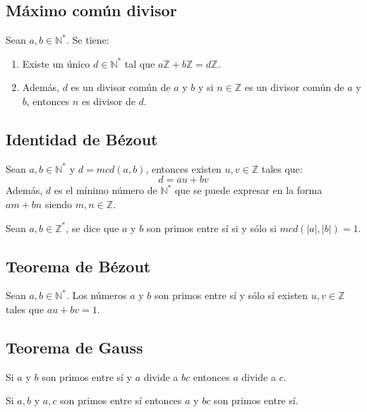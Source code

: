 \subsection{Máximo común divisor}

Sean $a,b \in \mathbb{N}^*$. Se tiene:
\begin{enumerate}
	\item Existe un único $d \in \mathbb{N}^*$ tal que $a\mathbb{Z}+b\mathbb{Z}=d\mathbb{Z}$.
	\item Además, $d$ es un divisor común de $a$ y $b$ y si $n \in \mathbb{Z}$ es un divisor común de $a$ y $b$, entonces $n$ es divisor de $d$.
\end{enumerate}

\subsection{Identidad de Bézout}

Sean $a,b \in \mathbb{N}^*$ y $d = mcd(a,b)$, entonces existen $u, v \in \mathbb{Z}$ tales que:
\[
d = au+bv
\]
Además, $d$ es el mínimo número de $\mathbb{N}^*$ que se puede expresar en la forma $am+bn$ siendo $m,n \in \mathbb{Z}$.

Sean $a,b \in \mathbb{Z}^*$, se dice que $a$ y $b$ son primos entre sí si y sólo si $mcd(|a|,|b|)=1$.

\subsection{Teorema de Bézout}

Sean $a,b \in \mathbb{N}^*$. Los números $a$ y $b$ son primos entre sí y sólo sí existen $u,v \in \mathbb{Z}$ tales que $au+bv=1$.

\subsection{Teorema de Gauss}

Si $a$ y $b$ son primos entre sí y $a$ divide a $bc$ entonces $a$ divide a $c$.

Si $a,b$ y $a,c$ son primos entre sí entonces $a$ y $bc$ son primos entre sí.